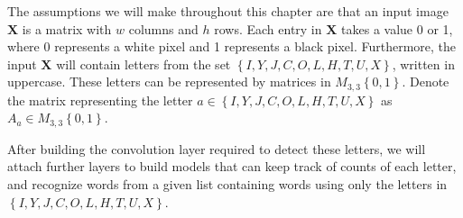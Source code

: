 \documentclass{somasmsc}
\begin{document}
The assumptions we will make throughout this chapter are that an input image $\mathbf{X}$ is a matrix with $w$ columns and $h$ rows. Each entry in $\mathbf{X}$ takes a value 0 or 1, where 0 represents a white pixel and 1 represents a black pixel. Furthermore, the input $\mathbf{X}$ will contain letters from the set $\left\{I, Y, J, C, O, L, H, T, U, X\right\}$, written in uppercase. These letters can be represented by matrices in $M_{3,3}\left\{0,1\right\}$. Denote the matrix representing the letter $a \in \left\{I, Y, J, C, O, L, H, T, U, X\right\}$ as $A_a \in M_{3,3}\left\{0,1\right\}$.

After building the convolution layer required to detect these letters, we will attach further layers to build models that can keep track of counts of each letter, and recognize words from a given list containing words using only the letters in $\left\{I, Y, J, C, O, L, H, T, U, X\right\}$.
\end{document}
